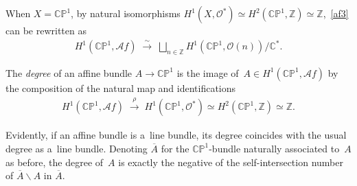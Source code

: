 \documentclass[pdftex]{sigma}
\numberwithin{equation}{section}
\begin{document}
When $X=\mathbb{CP}^1$, by natural isomorphisms $H^1(X,\mathscr O^*) \simeq H^2(\mathbb{CP}^1,\mathbb{Z})\simeq
\mathbb{Z}$,~\eqref{af3} can be rewritten as
\begin{gather}
\label{af4}
H^1(\mathbb{CP}^1,\mathscr Af)
\;\stackrel{\sim}{\longrightarrow}
\;
\bigsqcup_{n\in\mathbb{Z}} H^1(\mathbb{CP}^1, \mathscr O(n)) /\mathbb{C}^*.
\end{gather}

\begin{Definition}\label{def:degree}
The {\em degree} of an af\/f\/ine bundle $A\to\mathbb{CP}^1$ is the image of~$A\in H^1(\mathbb{CP}^1,\mathscr Af)$ by
the composition of the natural map and identif\/ications
\begin{gather*}
H^1(\mathbb{CP}^1,\mathscr Af)
\;\stackrel{\rho}{\longrightarrow}
\;
H^1(\mathbb{CP}^1,\mathscr O^*)\simeq
H^2(\mathbb{CP}^1,\mathbb{Z})\simeq \mathbb{Z}.
\end{gather*}
\end{Definition}

Evidently, if an af\/f\/ine bundle is a~line bundle, its degree coincides with the usual degree as a~line bundle.
Denoting $\overline A$ for the $\mathbb{CP}^1$-bundle naturally associated to~$A$ as before, the degree of~$A$ is
exactly the negative of the self-intersection number of $\overline A\backslash A$ in $\overline A$.
\end{document}
